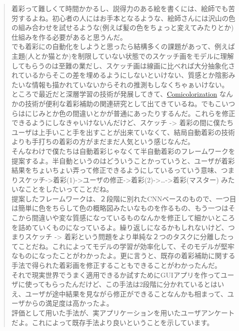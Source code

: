 \documentclass[a4paper, dvipdfmx, 10pt]{article}
\begin{document}
\begin{quote}
着彩って難しくて時間かかるし、説得力のある絵を書くには、絵師でも苦労するよね。初心者の人にはお手本となるような、絵師さんには沢山の色の組み合わせを試せるような(例えば髪の色をちょっと変えてみたりとか)仕組みを作る必要があると思うんだ。\\

でも着彩にの自動化をしようと思ったら結構多くの課題があって、例えば主題(人とか猫とか)を制限していない状態でのスケッチ画をモデルに理解してもらうのは至難の業だし、スケッチ画は線画に比べれば大分抽象化されているからそこの差を埋めるようにしないといけない、質感とか陰影みたいな情報も描かれていないからそれの推測もしなくちゃぁいけない。\\

ところで最近だと深層学習の技術が発展してきて、\href{https://nico-opendata.jp/ja/casestudy/comicolorization/index.html}{Comicolorization} なんかの技術が便利な着彩補助の関連研究として出てきているね。でもこいつらはにじみとか色の間違いとかが普通にあったりするんだ。これらを修正できるようにしなきゃいけないんだけど、スケッチ -> 着彩の間に僕たちユーザは上手いこと手を出すことが出来ていなくて、結局自動着彩の技術よりも手打ちの着彩の方がまだまだ人気という感じなんだ。\\

そんなわけで僕たちは自動着彩じゃなくて半自動着彩のフレームワークを提案するよ。半自動というのはどういうことかっていうと、ユーザが着彩結果をちょいちょい弄って修正できるようにしているっていう意味、つまりスケッチ->着彩(1)->ユーザの修正->着彩(2)->\ldots{}->着彩(マスター) みたいなことをしたいってことだね。\\
提案したフレームワークは、２段階に別れたCNNベースのもので、一つ目は簡単に色をちらして色の概略図みたいなものを作るもの、もう一つはそこから間違いや変な質感になっているものなんかを修正して細かいところを詰めていくものになっているよ。繰り返しになるかもしれないけど、つまりスケッチ -> 着彩という問題をより単純な２つのタスクに分離したってことだね。これによってモデルの学習が効率化して、そのモデルが堅牢なものになったことがわかったよ。更に言うと、既存の着彩補助に関する手法で得られた着彩画を修正することもできることがわかったんだ。\\

それで現実世界でうまく適用できるか試すためにGUIアプリを作ってユーザに使ってもらったんだけど、この手法は2段階に分かれているとはいえ、ユーザが途中結果を見ながら修正ができることなんかも相まって、ユーザからの満足度は高かったよ。\\

評価として用いた手法が、実アプリケーションを用いたユーザアンケートだよ。これによって既存手法より良いということを示しています。\\


\end{quote}
\end{document}
